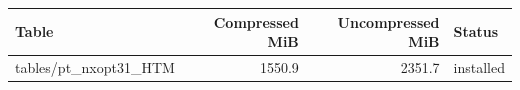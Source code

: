 {\small
\begin{tabular}{lrrl}
\hline
Table & Compressed MiB & Uncompressed MiB & Status \\
\hline
tables/pt\_nxopt31\_HTM & 1550.9 & 2351.7 & installed \\
\hline
\end{tabular}
}
